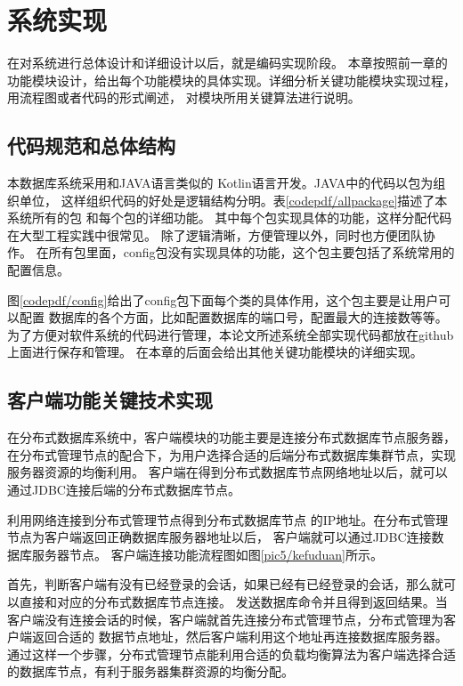 
\chapter{系统实现}
在对系统进行总体设计和详细设计以后，就是编码实现阶段。
本章按照前一章的功能模块设计，给出每个功能模块的具体实现。详细分析关键功能模块实现过程，用流程图或者代码的形式阐述，
对模块所用关键算法进行说明。
\section{代码规范和总体结构}
本数据库系统采用和JAVA语言类似的
Kotlin语言开发。JAVA中的代码以包为组织单位，
这样组织代码的好处是逻辑结构分明。表\ref{codepdf/allpackage}描述了本系统所有的包
和每个包的详细功能。
其中每个包实现具体的功能，这样分配代码在大型工程实践中很常见。
除了逻辑清晰，方便管理以外，同时也方便团队协作。
在所有包里面，config包没有实现具体的功能，这个包主要包括了系统常用的配置信息。

图\ref{codepdf/config}给出了config包下面每个类的具体作用，这个包主要是让用户可以配置
数据库的各个方面，比如配置数据库的端口号，配置最大的连接数等等。为了方便对软件系统的代码进行管理，本论文所述系统全部实现代码都放在github上面进行保存和管理。
在本章的后面会给出其他关键功能模块的详细实现。
\section{客户端功能关键技术实现}
在分布式数据库系统中，客户端模块的功能主要是连接分布式数据库节点服务器，在分布式管理节点的配合下，为用户选择合适的后端分布式数据库集群节点，实现服务器资源的均衡利用。
客户端在得到分布式数据库节点网络地址以后，就可以通过JDBC连接后端的分布式数据库节点。

利用网络连接到分布式管理节点得到分布式数据库节点
的IP地址。在分布式管理节点为客户端返回正确数据库服务器地址以后，
客户端就可以通过JDBC连接数据库服务器节点。
客户端连接功能流程图如图\ref{pic5/kefuduan}所示。

首先，判断客户端有没有已经登录的会话，如果已经有已经登录的会话，那么就可以直接和对应的分布式数据库节点连接。
发送数据库命令并且得到返回结果。当客户端没有连接会话的时候，客户端就首先连接分布式管理节点，分布式管理为客户端返回合适的
数据节点地址，然后客户端利用这个地址再连接数据库服务器。
通过这样一个步骤，分布式管理节点能利用合适的负载均衡算法为客户端选择合适的数据库节点，有利于服务器集群资源的均衡分配。
